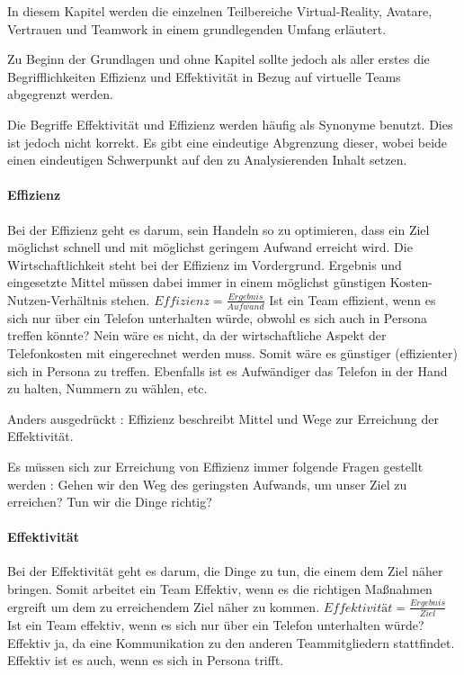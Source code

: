 \documentclass[a4paper,11pt]{article}%
\renewcommand{\\}{\vspace*{0.5\baselineskip} \newline}
\begin{document}
In diesem Kapitel werden die einzelnen Teilbereiche \dq{}Virtual-Reality\dq{}, \dq{}Avatare\dq{}, \dq{}Vertrauen\dq{} und \dq{}Teamwork\dq{} in einem grundlegenden Umfang  erläutert.

Zu Beginn der Grundlagen und ohne Kapitel sollte jedoch als aller erstes die Begrifflichkeiten \dq{}Effizienz\dq{} und \dq{}Effektivität\dq{} in Bezug auf virtuelle Teams abgegrenzt werden.

Die Begriffe Effektivität und Effizienz werden häufig als Synonyme benutzt. Dies ist jedoch nicht korrekt. Es gibt eine eindeutige Abgrenzung dieser, wobei beide einen eindeutigen Schwerpunkt auf den zu Analysierenden Inhalt setzen.

\paragraph{Effizienz}
Bei der Effizienz geht es darum, sein Handeln so zu optimieren, dass ein Ziel möglichst schnell und mit möglichst geringem Aufwand erreicht wird. Die Wirtschaftlichkeit steht bei der Effizienz im Vordergrund. Ergebnis und eingesetzte Mittel müssen dabei immer in einem möglichst günstigen Kosten-Nutzen-Verhältnis stehen.\\
$Effizienz = \frac{Ergebnis}{Aufwand}$ \\
Ist ein Team effizient, wenn es sich nur über ein Telefon unterhalten würde, obwohl es sich auch in Persona treffen könnte?
Nein wäre es nicht, da der wirtschaftliche Aspekt der Telefonkosten mit eingerechnet werden muss. Somit wäre es günstiger (effizienter) sich in Persona zu treffen. Ebenfalls ist es Aufwändiger das Telefon in der Hand zu halten, Nummern zu wählen, etc.

Anders ausgedrückt : Effizienz beschreibt Mittel und Wege zur Erreichung der Effektivität.

Es müssen sich zur Erreichung von Effizienz immer folgende Fragen gestellt werden :
Gehen wir den Weg des geringsten Aufwands, um unser Ziel zu erreichen?
Tun wir die Dinge richtig?

\paragraph{Effektivität}
Bei der Effektivität geht es darum, die Dinge zu tun, die einem dem Ziel näher bringen. 
Somit arbeitet ein Team Effektiv, wenn es die richtigen Maßnahmen ergreift um dem zu erreichendem Ziel näher zu kommen.\\
$Effektivität = \frac{Ergebnis}{Ziel}$ \\
Ist ein Team effektiv, wenn es sich nur über ein Telefon unterhalten würde?
Effektiv ja, da eine Kommunikation zu den anderen Teammitgliedern stattfindet.
Effektiv ist es auch, wenn es sich in Persona trifft.
\end{document}
